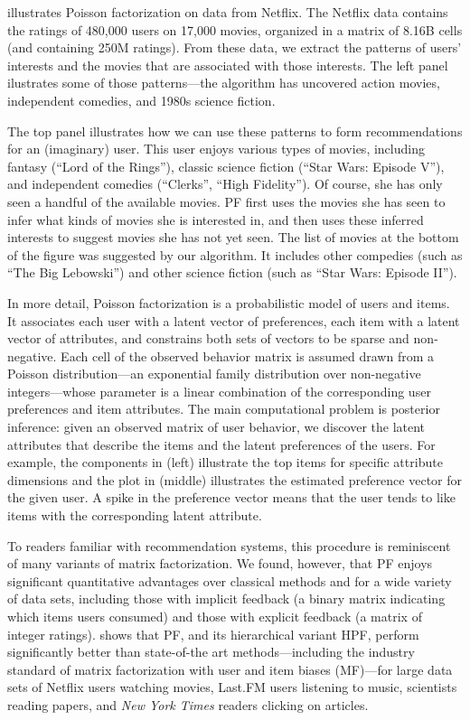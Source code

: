  illustrates Poisson factorization on data
from Netflix.  The Netflix data contains the ratings of 480,000 users
on 17,000 movies, organized in a matrix of 8.16B cells (and containing
250M ratings).  From these data, we extract the patterns of users'
interests and the movies that are associated with those interests.
The left panel ilustrates some of those patterns---the algorithm has
uncovered action movies, independent comedies, and 1980s science
fiction.

The top panel illustrates how we can use these patterns to form
recommendations for an (imaginary) user.  This user enjoys various
types of movies, including fantasy (``Lord of the Rings''), classic
science fiction (``Star Wars: Episode V''), and independent comedies
(``Clerks'', ``High Fidelity'').  Of course, she has only seen a
handful of the available movies.  PF first uses the movies she has
seen to infer what kinds of movies she is interested in, and then uses
these inferred interests to suggest movies she has not yet seen.  The
list of movies at the bottom of the figure was suggested by our
algorithm. It includes other compedies (such as ``The Big Lebowski'') and
other science fiction (such as ``Star Wars: Episode II'').

In more detail, Poisson factorization is a probabilistic model of
users and items.  It associates each user with a latent vector of
preferences, each item with a latent vector of attributes, and
constrains both sets of vectors to be sparse and non-negative.  Each
cell of the observed behavior matrix is assumed drawn from a Poisson
distribution---an exponential family distribution over non-negative
integers---whose parameter is a linear combination of the
corresponding user preferences and item attributes.  The main
computational problem is posterior inference: given an observed matrix
of user behavior, we discover the latent attributes that describe the
items and the latent preferences of the users.  For example, the
components in  (left) illustrate the top items for specific
attribute dimensions and the plot in  (middle) illustrates the
estimated preference vector for the given user.  A spike in the
preference vector means that the user tends to like items with the
corresponding latent attribute.

To readers familiar with recommendation systems, this procedure is
reminiscent of many variants of matrix factorization.  We found,
however, that PF enjoys significant quantitative advantages over
classical methods and for a wide variety of data sets, including those
with implicit feedback (a binary matrix indicating which items users
consumed) and those with explicit feedback (a matrix of integer
ratings).   shows that PF, and its
hierarchical variant HPF, perform significantly better than
state-of-the art methods---including the industry standard of matrix
factorization with user and item biases (MF)---for large data sets of
Netflix users watching movies, Last.FM users listening to music,
scientists reading papers, and \textit{New York Times} readers
clicking on articles.

